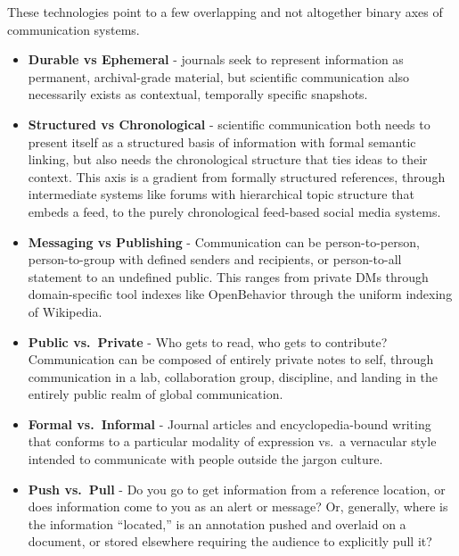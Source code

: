 These technologies point to a few overlapping and not altogether binary
axes of communication systems.

\begin{itemize}
\tightlist
\item
  \textbf{Durable vs Ephemeral} - journals seek to represent information
  as permanent, archival-grade material, but scientific communication
  also necessarily exists as contextual, temporally specific snapshots.
\item
  \textbf{Structured vs Chronological} - scientific communication both
  needs to present itself as a structured basis of information with
  formal semantic linking, but also needs the chronological structure
  that ties ideas to their context. This axis is a gradient from
  formally structured references, through intermediate systems like
  forums with hierarchical topic structure that embeds a feed, to the
  purely chronological feed-based social media systems.
\item
  \textbf{Messaging vs Publishing} - Communication can be
  person-to-person, person-to-group with defined senders and recipients,
  or person-to-all statement to an undefined public. This ranges from
  private DMs through domain-specific tool indexes like OpenBehavior
  through the uniform indexing of Wikipedia.
\item
  \textbf{Public vs.~Private} - Who gets to read, who gets to
  contribute? Communication can be composed of entirely private notes to
  self, through communication in a lab, collaboration group, discipline,
  and landing in the entirely public realm of global communication.
\item
  \textbf{Formal vs.~Informal} - Journal articles and encyclopedia-bound
  writing that conforms to a particular modality of expression vs.~a
  vernacular style intended to communicate with people outside the
  jargon culture.
\item
  \textbf{Push vs.~Pull} - Do you go to get information from a reference
  location, or does information come to you as an alert or message? Or,
  generally, where is the information ``located,'' is an annotation
  pushed and overlaid on a document, or stored elsewhere requiring the
  audience to explicitly pull it?
\end{itemize}

